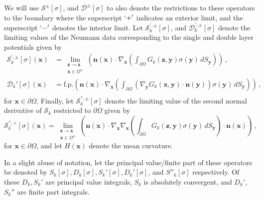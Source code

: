 \documentclass[11pt]{article}
\newcommand\bn{\boldsymbol n}
\newcommand\bx{\boldsymbol x}
\newcommand\by{\boldsymbol y}
\newcommand\bz{\boldsymbol{z}}
\newcommand\cS{\mathcal{S}}
\newcommand\cD{\mathcal{D}}
\newcommand\pa{\partial}
\theoremstyle{definition}
\theoremstyle{remark}
\numberwithin{equation}{section}
\begin{document}
We will use $\cS^{\pm}[\sigma]$, and $\cD^{\pm}[\sigma]$ to also denote the restrictions to these operators to the boundary where the superscript $`+'$ indicates an exterior limit, and the superscript $`-'$ denotes the interior limit.
Let $\cS_{k}^{',\pm}[\sigma]$, and $\cD_{k}^{',\pm}[\sigma]$ denote the limiting values of the Neumann data corresponding to the single and double layer potentials given by
\begin{equation}
\begin{aligned}
\cS_{k}^{',\pm}[\sigma](\bx) &= \lim_{\substack{\bz \to  \bx \\ \bx \in \Omega^{\pm}}} \left(  \bn(\bx) \cdot \nabla_{\bx} \left(  \int_{\pa \Omega} G_{k}(\bz,\by) \sigma(\by) \, dS_{\by}\right) \right)   \, , \\
\cD_{k}'[\sigma](\bx) &= \textrm{f.p.} \left(  \bn(\bx) \cdot \nabla_{\bx} \left(  \int_{\pa \Omega} \left(\nabla_{\by}  G_{k}(\bx,\by) \cdot \bn(\by) \right) \sigma(\by) \, dS_{\by}\right) \right)   \, , \\
\end{aligned}
\end{equation}
for $\bx \in \pa \Omega$. 
Finally, let $\cS_{k}^{'',\pm}[\sigma]$ denote the limiting value of the second normal derivative of $\cS_{k}$ restricted to $\pa \Omega$ given by
\begin{equation}
\cS_{k}^{'',+}[\sigma](\bx) = \lim_{\substack{\bz \to  \bx \\ \bx \in \Omega^{\pm}}} \left(  \bn(\bx) \cdot \nabla_{\bx} \nabla_{\bx} \left(  \int_{\pa \Omega} G_{k}(\bz,\by) \sigma(\by) \, dS_{\by}\right) \cdot \bn(\bx) \right) \, ,
\end{equation}
for $\bx \in \pa \Omega$, and let $H(\bx)$ denote the mean curvature. 

In a slight abuse of notation, let the principal value/finite part of these operators be denoted by
$S_{k}[\sigma], D_{k}[\sigma], S_{k}'[\sigma], D_{k}'[\sigma]$, and $S''_{k}[\sigma]$ respectively. Of these $D_{k}, S_{k}'$ are principal value integrals, $S_{k}$ is absolutely convergent, and $D_{k}'$, $S_{k}''$ are finite part integrals.
\end{document}
